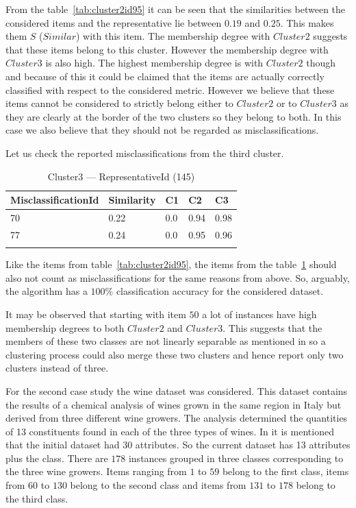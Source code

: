 From the table~\ref{tab:cluster2id95} it can be seen  that the similarities between the considered items and the representative lie between $0.19$ and $0.25$. This makes them $S$ ($Similar$) with this item. The membership degree with $Cluster2$ suggests that these items belong to this cluster. However the membership degree with $Cluster3$ is also high. The highest membership degree is with $Cluster2$ though and because of this it could be claimed that the items are actually correctly classified with respect to the considered metric. However we believe that these items cannot be considered to strictly belong either to $Cluster2$ or to $Cluster3$ as they are clearly at the border of the two clusters so they belong to both. In this case we also believe that they should not be regarded as misclassifications.

Let us check the reported misclassifications from the third cluster.

\begin{table}[h!]
\begin{tabular}{lllll}
\cline{1-5}
MisclassificationId & Similarity   & C1 & C2 & C3\\ 
\hline
70 & 0.22 & 0.0 &    0.94 &   0.98\\
77 & 0.24  & 0.0 &   0.95 &  0.96\\
\hline\\
\end{tabular} 
\caption{Cluster3 --- RepresentativeId (145)}
\label{tab:cluster3id145}
\end{table}

Like the items from table~\ref{tab:cluster2id95}, the items from the table~\ref{tab:cluster3id145} should also not count as misclassifications for the same reasons from above. So, arguably, the algorithm has a $100\%$ classification accuracy for the considered dataset.

It may be observed that starting with item $50$ a lot of instances have high membership degrees to both $Cluster2$ and $Cluster3$. This suggests that the  members of these two classes are not linearly separable as mentioned in \cite{website:iris} so a clustering process could also merge these two clusters and hence report only two clusters instead of three. 

For the second case study the wine dataset \cite{website:wine} was considered. This dataset contains the results of a chemical analysis of wines grown in the same region in Italy but derived from three different wine growers. The analysis determined the quantities of 13 constituents found in each of the three types of wines. In \cite{website:wine} it is mentioned that the initial dataset had 30 attributes. So the current dataset has 13 attributes plus the class. There are $178$ instances grouped in three classes corresponding to the three wine growers. Items ranging from $1$ to $59$ belong to the first class, items from $60$ to $130$ belong to the second class and items from $131$ to $178$ belong to the third class. 

